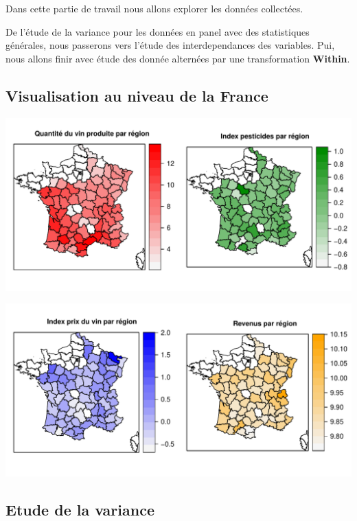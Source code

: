 \documentclass[11pt,]{article}
\begin{document}
Dans cette partie de travail nous allons explorer les données
collectées.

\par

De l'étude de la variance pour les données en panel avec des
statistiques générales, nous passerons vers l'étude des interdependances
des variables. Pui, nous allons finir avec étude des donnée alternées
par une transformation \textbf{Within}.

\hypertarget{visualisation-au-niveau-de-la-france}{%
\subsection{Visualisation au niveau de la
France}\label{visualisation-au-niveau-de-la-france}}

\begin{center}\includegraphics{note2pres_files/figure-latex/unnamed-chunk-16-1} \end{center}

\begin{center}\includegraphics{note2pres_files/figure-latex/unnamed-chunk-17-1} \end{center}

\hypertarget{etude-de-la-variance}{%
\subsection{Etude de la variance}\label{etude-de-la-variance}}
\end{document}
